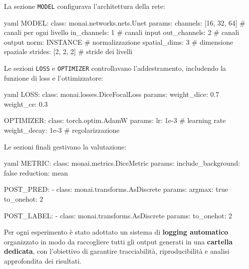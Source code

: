 La sezione \texttt{MODEL} configurava l'architettura della rete:

\begin{code}{yaml}
MODEL:
  class: monai.networks.nets.Unet
  params:
    channels: [16, 32, 64]  # canali per ogni livello
    in_channels: 1          # canali input
    out_channels: 2         # canali output
    norm: INSTANCE          # normalizzazione
    spatial_dims: 3         # dimensione spaziale
    strides: [2, 2, 2]      # stride dei livelli
\end{code}


Le sezioni \texttt{LOSS} e \texttt{OPTIMIZER} controllavano l'addestramento, includendo la funzione di loss e l'ottimizzatore:


\begin{code}{yaml}
LOSS:
  class: monai.losses.DiceFocalLoss
  params:
    weight_dice: 0.7
    weight_ce: 0.3

OPTIMIZER:
  class: torch.optim.AdamW
  params:
    lr: 1e-3               # learning rate
    weight_decay: 1e-3      # regolarizzazione
\end{code}


Le sezioni finali gestivano la valutazione:

\begin{code}{yaml}
METRIC:
  class: monai.metrics.DiceMetric
  params:
    include_background: false
    reduction: mean

POST_PRED:                                                                              
  - class: monai.transforms.AsDiscrete
    params:
      argmax: true
      to_onehot: 2

POST_LABEL:                                                                                 
  - class: monai.transforms.AsDiscrete
    params:
      to_onehot: 2
\end{code}




Per ogni esperimento è stato adottato un sistema di \textbf{logging automatico} organizzato in modo da raccogliere tutti gli output generati in una \textbf{cartella dedicata}, con l’obiettivo di garantire tracciabilità, riproducibilità e analisi approfondita dei risultati.

